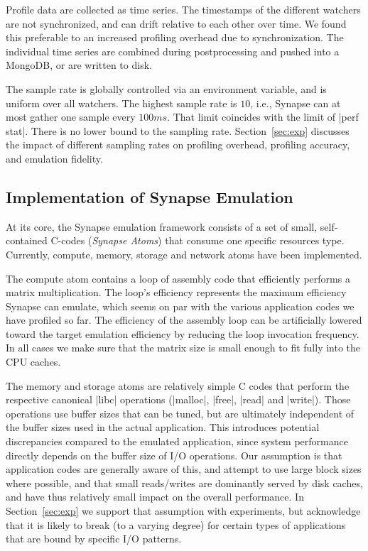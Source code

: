 \documentclass[10pt, conference, compsocconf]{IEEEtran}
\newcommand{\I}[1]{\textit{#1}\xspace}
\newcommand{\synapse}{Synapse\xspace}
\newcommand{\Synapse}{Synapse\xspace}
\begin{document}
 Profile data are collected as time series.  The timestamps of the
 different watchers are not synchronized, and can drift relative to
 each other over time.  We found this preferable to an increased
 profiling overhead due to synchronization.  The individual time
 series are combined during postprocessing and pushed into a MongoDB,
 or are written to disk.

 The sample rate is globally controlled via an environment variable,
 and is uniform over all watchers.  The highest sample rate is $10$,
 i.e., \synapse can at most gather one sample every $100 ms$.  That limit
 coincides with the limit of |perf stat|.  There is no lower bound to
 the sampling rate.  Section~\ref{sec:exp} discusses the impact of
 different sampling rates on profiling overhead, profiling accuracy,
 and emulation fidelity.


 \subsection{Implementation of \Synapse Emulation}

 At its core, the \synapse emulation framework consists of a set of
 small, self-contained C-codes (\I{\synapse Atoms}) that consume one
 specific resources type.  Currently, compute, memory, storage and
 network atoms have been implemented.

 The compute atom contains a loop of assembly code that efficiently
 performs a matrix multiplication.  The loop's efficiency represents
 the maximum efficiency \synapse can emulate, which seems on par with
 the various application codes we have profiled so far.  The
 efficiency of the assembly loop can be artificially lowered toward
 the target emulation efficiency by reducing the loop invocation
 frequency.  In all cases we make sure that the matrix size is small
 enough to fit fully into the CPU caches.

 The memory and storage atoms are relatively simple C codes that
 perform the respective canonical |libc| operations (|malloc|, |free|,
 |read| and |write|).  Those operations use buffer sizes that can be
 tuned, but are ultimately independent of the buffer sizes used in the
 actual application.  This introduces potential discrepancies compared
 to the emulated application, since system performance directly
 depends on the buffer size of I/O operations.  Our assumption is that
 application codes are generally aware of this, and attempt to use
 large block sizes where possible, and that small reads/writes are
 dominantly served by disk caches, and have thus
 relatively small impact on the overall performance.  In
 Section~\ref{sec:exp} we support that assumption with experiments,
 but acknowledge that it is likely to break (to a varying degree) for
 certain types of applications that are bound by specific I/O
 patterns.
 
\end{document}
